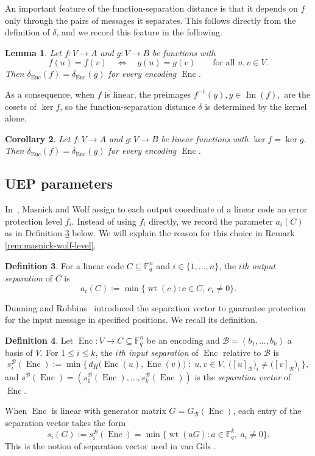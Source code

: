 \documentclass[a4paper,12pt]{article}
\theoremstyle{plain}
\newtheorem{lemma}{Lemma}[section]
\newtheorem{corollary}[lemma]{Corollary}
\theoremstyle{definition}
\newtheorem{definition}[lemma]{Definition}
\newcommand{\F}{\mathbb F}
\newcommand{\wt}{\operatorname{wt}}
\newcommand{\Enc}{\operatorname{Enc}}
\newcommand{\Imf}{\operatorname{Im}}
\begin{document}
 An important feature of the function-separation distance is that it depends on $f$ only through the pairs of messages it separates. This follows directly from the definition of $\delta$, and we record this feature in the following. 
\begin{lemma}\label{prop:fiber-invariance}
Let $f\colon V\to A$ and $g\colon V\to B$ be functions with
\[
f(u)=f(v)\quad\Longleftrightarrow\quad g(u)=g(v)
\qquad\text{for all }u,v\in V.
\]
Then $\delta_{\Enc}(f)=\delta_{\Enc}(g)$ for every encoding
$\Enc$.
\end{lemma} 

As a consequence,  when $f$ is linear, the preimages $f^{-1}(y), y \in \Imf(f),$  are the cosets of $\ker f$, so the function-separation distance $\delta$ is determined by the kernel alone.
\begin{corollary}\label{cor:kernel-invariance}
Let $f\colon V\to A$ and $g\colon V\to B$ be linear functions with
$\ker f=\ker g$. Then $\delta_{\Enc}(f)=\delta_{\Enc}(g)$ for every
encoding $\Enc$.
\end{corollary} 

\subsection{UEP parameters}  \label{sec:uepdef}
In~\cite{masnick1967}, Masnick and Wolf assign to each output coordinate of a linear code an error protection level $f_i$.
 Instead of using $f_i$ directly, we record the parameter $a_i(C)$ as in Definition \ref{def:output-separation} below. We will explain the reason for this choice in Remark \ref{rem:masnick-wolf-level}.
\begin{definition} \label{def:output-separation}
For a linear code $C\subseteq\F_q^n$ and $i\in\{1,\dots,n\}$, the
\emph{$i$th output separation} of $C$ is
\[
a_i(C):=
\min\{\wt(c):c\in C,\ c_i\neq0\}.
\]
\end{definition}

Dunning and Robbins~\cite{dunning1978} introduced the separation vector to guarantee protection for the input message in specified positions. We recall its definition. 
\begin{definition}
\label{def:input-separation}
Let $\Enc\colon V\to C\subseteq\F_q^n$ be an encoding and $\mathcal B=(b_1,\dots,b_k)$
a basis of $V$. For $1\le i\le k$, the \emph{$i$th input separation} of $\Enc$
relative to $\mathcal B$ is
\[
s_i^{\mathcal B}(\Enc)
:=\min\bigl\{\,d_H\bigl(\Enc(u),\Enc(v)\bigr)\;:\;u,v\in V,\
\bigl([u]_{\mathcal B}\bigr)_i\neq\bigl([v]_{\mathcal B}\bigr)_i\,\bigr\},
\]
and $s^{\mathcal B}(\Enc)=(s_1^{\mathcal B}(\Enc),\dots,s_k^{\mathcal B}(\Enc))$
is the \emph{separation vector} of $\Enc$. 
\end{definition}
When $\Enc$ is linear with generator matrix $G=G_{\mathcal B}(\Enc)$, each entry of the separation vector takes the form
\[
s_i(G):=s_i^{\mathcal B}(\Enc)=\min\{\wt(aG):a\in\F_q^k,\ a_i\neq0\}.
\]
This is the notion of separation vector used in  van Gils \cite{vangils1983}. 
\end{document}
